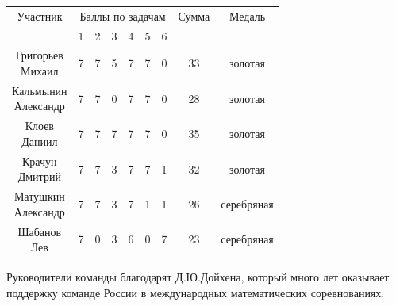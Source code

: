\begin{multicols}{2}
    {\par \hspace*{-0.9cm}
    \begin{tabular}{c c c c c c c c c}
        Участник & \multicolumn{6}{c}{Баллы по задачам} & Сумма & Медаль \\ 
        & 1 & 2 & 3 & 4 & 5 & 6 & & \\ 
        \makecell[{{p{1.5cm}}}]{\raggedright Григорьев\\Михаил} & 7 & 7 & 5 & 7 & 7 & 0 & 33 & золотая \\ 
        \makecell[{{p{1.5cm}}}]{\raggedright Кальмынин\\Александр} & 7 & 7 & 0 & 7 & 7 & 0 & 28 & золотая \\ 
        \makecell[{{p{1.5cm}}}]{\raggedright Клоев\\Даниил} & 7 & 7 & 7 & 7 & 7 & 0 & 35 & золотая \\ 
        \makecell[{{p{1.5cm}}}]{\raggedright Крачун\\Дмитрий} & 7 & 7 & 3 & 7 & 7 & 1 & 32 & золотая \\ 
        \makecell[{{p{1.5cm}}}]{\raggedright Матушкин\\Александр} & 7 & 7 & 3 & 7 & 1 & 1 & 26 & серебряная \\ 
        \makecell[{{p{1.5cm}}}]{\raggedright Шабанов\\Лев} & 7 & 0 & 3 & 6 & 0 & 7 & 23 & серебряная \\ 
    \end{tabular}
    }
    {\par \hspace*{0.2cm}Руководители команды благодарят Д.Ю.Дойхена, который много лет оказывает поддержку команде России в международных математических соревнованиях. }

\end{multicols}
